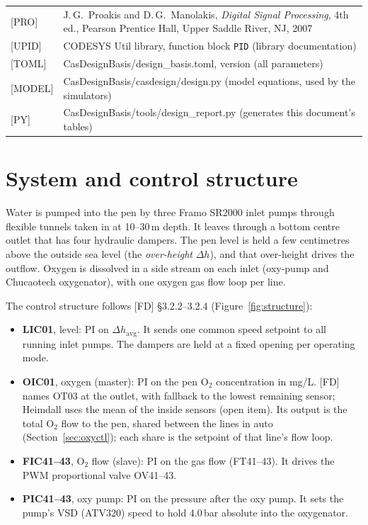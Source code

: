 \documentclass[11pt]{article}
\begin{document}
\begin{tabularx}{\textwidth}{@{}lL@{}}
{[PRO]}   & J.\,G.~Proakis and D.\,G.~Manolakis, \emph{Digital Signal Processing}, 4th ed., Pearson Prentice Hall, Upper Saddle River, NJ, 2007 \\
{[UPID]}  & CODESYS Util library, function block \texttt{PID} (library documentation) \\
{[TOML]}  & CasDesignBasis/design\_basis.toml, version \CASVersion{} (all parameters) \\
{[MODEL]} & CasDesignBasis/casdesign/design.py (model equations, used by the simulators) \\
{[PY]}    & CasDesignBasis/tools/design\_report.py (generates this document's tables) \\
\bottomrule
\end{tabularx}

\section{System and control structure}

Water is pumped into the pen by three Framo SR2000 inlet pumps through flexible tunnels taken in
at 10--30\,m depth. It leaves through a bottom centre outlet that has four hydraulic dampers. The
pen level is held a few centimetres above the outside sea level (the \emph{over-height}
$\Delta h$), and that over-height drives the outflow. Oxygen is dissolved in a side stream on
each inlet (oxy-pump and Chucaotech oxygenator), with one oxygen gas flow loop per line.

The control structure follows [FD] §3.2.2--3.2.4 (Figure~\ref{fig:structure}):
\begin{itemize}
  \item \textbf{LIC01}, level: PI on $\Delta h_\text{avg}$. It sends one common speed setpoint
        to all running inlet pumps. The dampers are held at a fixed opening per operating mode.
  \item \textbf{OIC01}, oxygen (master): PI on the pen O$_2$ concentration in mg/L. [FD] names
        OT03 at the outlet, with fallback to the lowest remaining sensor; Heimdall uses the mean of
        the inside sensors (open item). Its output is the total O$_2$ flow to the pen, shared
        between the lines in auto (Section~\ref{sec:oxyctl}); each share is the setpoint of that
        line's flow loop.
  \item \textbf{FIC41--43}, O$_2$ flow (slave): PI on the gas flow (FT41--43). It drives the
        PWM proportional valve OV41--43.
  \item \textbf{PIC41--43}, oxy pump: PI on the pressure after the oxy pump. It sets the pump's
        VSD (ATV320) speed to hold 4.0\,bar absolute into the oxygenator.
\end{itemize}
\end{document}
